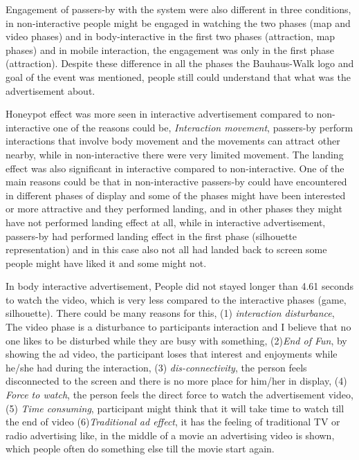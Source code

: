 Engagement of passers-by with the system were also different in three conditions, in non-interactive people might be engaged in watching the two phases (map and video phases) and in body-interactive in the first two phases (attraction, map phases) and in mobile interaction, the engagement was only in the first phase (attraction). Despite these difference in all the phases the Bauhaus-Walk logo and goal of the event was mentioned, people still could understand that what was the advertisement about.

Honeypot effect was more seen in interactive advertisement compared to non-interactive one of the reasons could be, \emph{Interaction movement}, passers-by perform interactions that involve body movement and the movements can attract other nearby, while in non-interactive there were very limited movement. The landing effect was also significant in interactive compared to non-interactive. One of the main reasons could be that in non-interactive passers-by could have encountered in different phases of display and some of the phases might have been interested or more attractive and they performed landing, and in other phases they might have not performed landing effect at all, while in interactive advertisement, passers-by had performed landing effect in the first phase (silhouette representation) and in this case also not all had landed back to screen some people might have liked it and some might not.

In body interactive advertisement, People did not stayed longer than 4.61 seconds to watch the video, which is very less compared to the interactive phases (game, silhouette). There could be many reasons for this, (1) \emph{interaction disturbance}, The video phase is a disturbance to participants interaction and I believe that no one likes to be disturbed while they are busy with something, (2)\emph{End of Fun}, by showing the ad video, the participant loses that interest and enjoyments while he/she had during the interaction, (3) \emph{dis-connectivity}, the person feels disconnected to the screen and there is no more place for him/her in display, (4) \emph{Force to watch}, the person feels the direct force to watch the advertisement video, (5) \emph{Time consuming}, participant might think that it will take time to watch till the end of video  (6)\emph{Traditional ad effect}, it has the feeling of traditional TV or radio advertising like, in the middle of a movie an advertising video is shown, which people often do something else till the movie start again.

